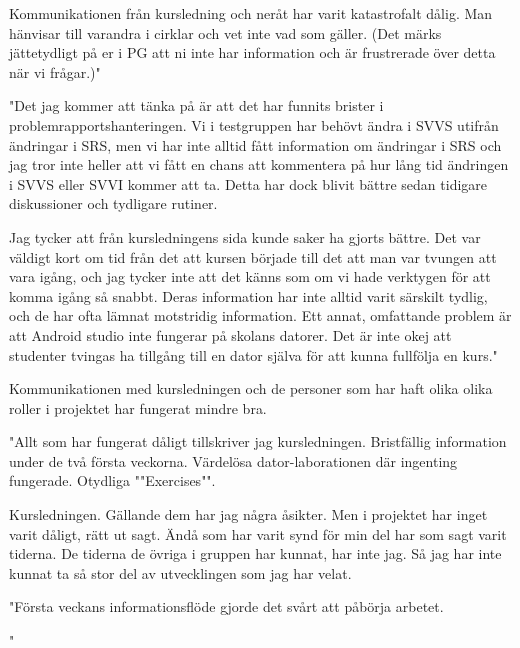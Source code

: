 \documentclass[a4paper]{article}
\begin{document}
Kommunikationen från kursledning och neråt har varit katastrofalt dålig. Man hänvisar till varandra i cirklar och vet inte vad som gäller. (Det märks jättetydligt på er i PG att ni inte har information och är frustrerade över detta när vi frågar.)"

"Det jag kommer att tänka på är att det har funnits brister i problemrapportshanteringen. Vi i testgruppen har behövt ändra i SVVS utifrån ändringar i SRS, men vi har inte alltid fått information om ändringar i SRS och jag tror inte heller att vi fått en chans att kommentera på hur lång tid ändringen i SVVS eller SVVI kommer att ta. Detta har dock blivit bättre sedan tidigare diskussioner och tydligare rutiner.

Jag tycker att från kursledningens sida kunde saker ha gjorts bättre. Det var väldigt kort om tid från det att kursen började till det att man var tvungen att vara igång, och jag tycker inte att det känns som om vi hade verktygen för att komma igång så snabbt. Deras information har inte alltid varit särskilt tydlig, och de har ofta lämnat motstridig information. Ett annat, omfattande problem är att Android studio inte fungerar på skolans datorer. Det är inte okej att studenter tvingas ha tillgång till en dator själva för att kunna fullfölja en kurs."

Kommunikationen med kursledningen och de personer som har haft olika olika roller i projektet har fungerat mindre bra. 

"Allt som har fungerat dåligt tillskriver jag kursledningen.
Bristfällig information under de två första veckorna.
Värdelösa dator-laborationen där ingenting fungerade.
Otydliga ""Exercises"".

Kursledningen. Gällande dem har jag några åsikter. Men i projektet har inget varit dåligt, rätt ut sagt. Ändå som har varit synd för min del har som sagt varit tiderna. De tiderna de övriga i gruppen har kunnat, har inte jag. Så jag har inte kunnat ta så stor del av utvecklingen som jag har velat.  

"Första veckans informationsflöde gjorde det svårt att påbörja arbetet.

"
\end{document}
